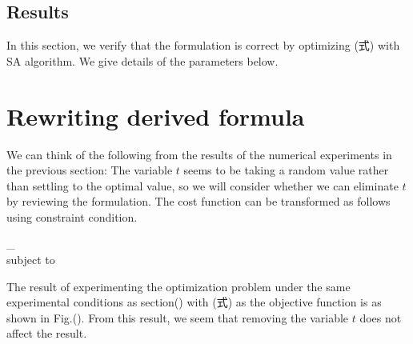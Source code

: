 \documentclass[fp,twocolumn]{jpsj3}
\begin{document}
\subsection{Results} %
In this section, we verify that the formulation is correct by optimizing (式) with SA algorithm. We give details of the parameters below.
\begin{items}
\item 
\item 
\end{items}

\section{Rewriting derived formula} %
We can think of the following from the results of the numerical experiments in the previous section: The variable $t$ seems to be taking a random value rather than settling to the optimal value, so we will consider whether we can eliminate $t$ by reviewing the formulation. 
The cost function can be transformed as follows using constraint condition.
\begin{}
\min_{}{} \\
subject to 
\end{}


The result of experimenting the optimization problem under the same experimental conditions as section() with (式) as the objective function is as shown in Fig.(). From this result, we seem that removing the variable $t$ does not affect the result. 

\begin{acknowledgment}



\end{acknowledgment}



\begin{thebibliography}{1}
\end{thebibliography}
\end{document}
